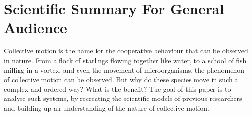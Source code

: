 \documentclass[%
11pt,
amsmath, amssymb,
aps,
pra
]{revtex4-2}
\begin{document}

\newpage\newpage
\section*{Scientific Summary For General Audience}
Collective motion is the name for the cooperative behaviour that can be observed in nature. 
From a flock of starlings flowing together like water, to a school of fish milling in a vortex, 
and even the movement of microorganisms, the phenomenon of collective motion can be observed. 
But why do these species move in such a complex and ordered way? What is the benefit? 
The goal of this paper is to analyse such systems, by recreating the scientific models of previous researchers 
and building up an understanding of the nature of collective motion. 
\end{document}
